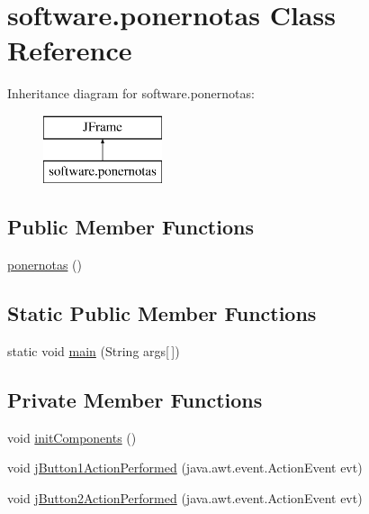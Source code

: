 \hypertarget{classsoftware_1_1ponernotas}{}\section{software.\+ponernotas Class Reference}
\label{classsoftware_1_1ponernotas}
Inheritance diagram for software.\+ponernotas\+:\begin{figure}[H]
\begin{center}
\leavevmode
\includegraphics[height=2.000000cm]{classsoftware_1_1ponernotas}
\end{center}
\end{figure}
\subsection*{Public Member Functions}
\begin{DoxyCompactItemize}
\item 
\mbox{\hyperlink{classsoftware_1_1ponernotas_a414e3fc6867bed1d7b001e2299c18bbf}{ponernotas}} ()
\end{DoxyCompactItemize}
\subsection*{Static Public Member Functions}
\begin{DoxyCompactItemize}
\item 
static void \mbox{\hyperlink{classsoftware_1_1ponernotas_a43c864721c1cde458039646a64ce72c3}{main}} (String args\mbox{[}$\,$\mbox{]})
\end{DoxyCompactItemize}
\subsection*{Private Member Functions}
\begin{DoxyCompactItemize}
\item 
void \mbox{\hyperlink{classsoftware_1_1ponernotas_ad1e0b287e6033a145feeefd7fc05847b}{init\+Components}} ()
\item 
void \mbox{\hyperlink{classsoftware_1_1ponernotas_a99036ee7583ce0aca853962f41f7a5d2}{j\+Button1\+Action\+Performed}} (java.\+awt.\+event.\+Action\+Event evt)
\item 
void \mbox{\hyperlink{classsoftware_1_1ponernotas_a1b22c329acda989f58386bdfe78f9ff4}{j\+Button2\+Action\+Performed}} (java.\+awt.\+event.\+Action\+Event evt)
\end{DoxyCompactItemize}

